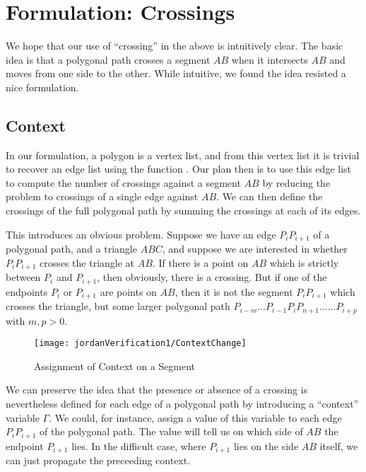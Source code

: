 
\section{Formulation: Crossings}
We hope that our use of ``crossing'' in the above is intuitively clear. The basic idea is that a polygonal path crosses a segment $AB$ when it intersects $AB$ and moves from one side to the other. While intuitive, we found the idea resisted a nice formulation.

\subsection{Context}
In our formulation, a polygon is a vertex list, and from this vertex list it is trivial to recover an edge list using the function . Our plan then is to use this edge list to compute the number of crossings against a segment $AB$ by reducing the problem to crossings of a single edge against $AB$. We can then define the crossings of the full polygonal path by summing the crossings at each of its edges. 

This introduces an obvious problem. Suppose we have an edge $P_iP_{i+1}$ of a polygonal path, and a triangle $ABC$, and suppose we are interested in whether $P_iP_{i+1}$ crosses the triangle at $AB$. If there is a point on $AB$ which is strictly between $P_i$ and $P_{i+1}$, then obviously, there is a crossing. But if one of the endpoints $P_{i}$ or $P_{i+1}$ are points on $AB$, then it is not the segment $P_iP_{i+1}$ which crosses the triangle, but some larger polygonal path $P_{i-m}\ldots P_{i-1}P_iP_{n+1}\ldots...P_{i+p}$ with $m,p > 0$. 

\begin{figure}
\centering\texttt{[image: jordanVerification1/ContextChange]}
\caption{Assignment of Context on a Segment}
\label{fig:ContextChanges}
\end{figure}

We can preserve the idea that the presence or absence of a crossing is nevertheless defined for each edge of a polygonal path by introducing a  ``context'' variable $\Gamma$. We could, for instance, assign a value of this variable to each edge $P_iP_{i+1}$ of the polygonal path. The value will tell us on which side of $AB$ the endpoint $P_{i+1}$ lies. In the difficult case, where $P_{i+1}$ lies on the side $AB$ itself, we can just propagate the preceeding context.

